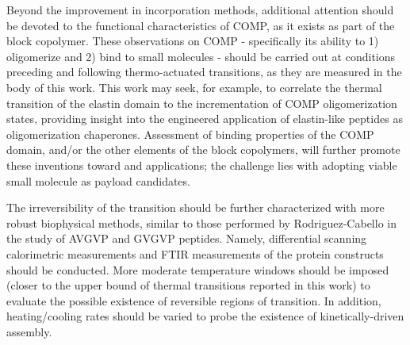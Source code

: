 \begin{refsection}
Beyond the improvement in incorporation methods, additional attention should be
devoted to the functional characteristics of COMP, as it exists as part of the
block copolymer. These observations on COMP - specifically its ability to 1)
oligomerize and 2) bind to small molecules - should be carried out at conditions
preceding and following thermo-actuated transitions, as they are measured in the
body of this work. This work may seek, for example, to correlate the thermal
transition of the elastin domain to the incrementation of COMP oligomerization
states, providing insight into the engineered application of elastin-like
peptides as oligomerization chaperones. Assessment of binding properties of the
COMP domain, and/or the other elements of the block copolymers, will further
promote these inventions toward  and 
applications; the challenge lies with adopting viable small molecule as payload
candidates.

The irreversibility of the transition should be further characterized with more
robust biophysical methods, similar to those performed by Rodriguez-Cabello in
the study of AVGVP and GVGVP peptides.\cite{Schmidt2005} Namely, differential
scanning calorimetric measurements and FTIR measurements of the protein
constructs should be conducted. More moderate temperature windows should be
imposed (closer to the upper bound of thermal transitions reported in this work)
to evaluate the possible existence of reversible regions of transition. In
addition, heating/cooling rates should be varied to probe the existence of
kinetically-driven assembly.

\printbibliography[heading=subbibliography]

\end{refsection}
